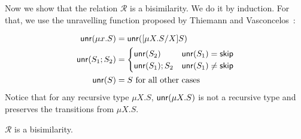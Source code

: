 Now we show that the relation $\mathcal{R}$ is a bisimilarity. We do it
by induction. For that, we use the unravelling function proposed 
by Thiemann and Vasconcelos~\cite{thiemann2016context}:

\[\begin{aligned}
\mathsf{unr}(\mu x . S) &= \mathsf{unr}([{\mu X.S}/{X}] S)\\
\mathsf{unr}(S_1;S_2) &= 
\begin{cases}
	\mathsf{unr}(S_2) & \mathsf{unr}(S_1)=\mathsf{skip}\\
	\mathsf{unr}(S_1);S_2 & \mathsf{unr}(S_1)\neq\mathsf{skip}\\
\end{cases} \\
\mathsf{unr}(S)&= S \text{  for all other cases}
\end{aligned}\]
%
Notice that for any recursive type 
$\mu X.S$, $\mathsf{unr}(\mu X.S)$ is not a recursive type and preserves the 
transitions from $\mu X.S$.

\begin{theorem}
\label{thm:cfst_vs_grammar}
	$\mathcal{R}$ is a bisimilarity.
\end{theorem}

